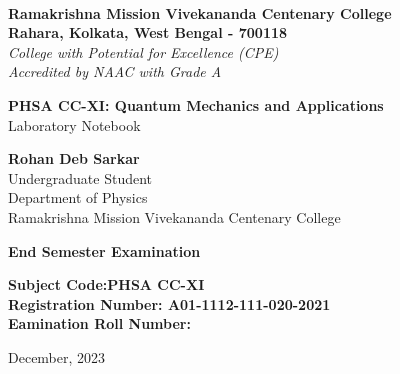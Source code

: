 \begin{titlepage}
    \begin{center}
        \\
        \large\textbf{Ramakrishna Mission Vivekananda Centenary College}\\
        \normalsize\textbf{Rahara, Kolkata, West Bengal - 700118}\\
        \small\slshape College with Potential for Excellence (CPE)\\
        \small\normalfont Accredited by NAAC with Grade A

        \vfill

        \large\textbf{PHSA CC-XI: Quantum Mechanics and Applications}\\
        \normalsize Laboratory Notebook

        \vfill

        \large\textbf{Rohan Deb Sarkar}\\
        \normalsize Undergraduate Student\\
        \normalsize Department of Physics\\
        \normalsize Ramakrishna Mission Vivekananda Centenary College

        \vfill

        \large \textbf{End Semester Examination}\\

        \vspace{2em}

        \normalsize
        \textbf{Subject Code:\hfill PHSA CC-XI\\
                Registration Number: \hfill A01-1112-111-020-2021\\
                Eamination Roll Number: \hfill \phantom{0000000000}\\
        }
        
        \vfill

        \normalsize December, 2023
    \end{center}
\end{titlepage}